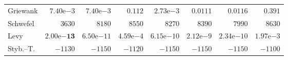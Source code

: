 \begin{tabular}{lrrrrrrr}
Griewank & $7.40\mathrm{e}{-3}$ & $7.40\mathrm{e}{-3}$ & $0.112$ & $2.73\mathrm{e}{-3}$ & $0.0111$ & $0.0116$ & $0.391$ \\
Schwefel & $3630$ & $8180$ & $8550$ & $8270$ & $8390$ & $7990$ & $8630$ \\
Levy & $\mathbf{2.00\mathrm{e}{-13}}$ & $6.50\mathrm{e}{-11}$ & $4.59\mathrm{e}{-4}$ & $6.15\mathrm{e}{-10}$ & $2.12\mathrm{e}{-9}$ & $2.34\mathrm{e}{-10}$ & $1.97\mathrm{e}{-3}$ \\
Styb.--T. & $-1130$ & $-1150$ & $-1120$ & $-1150$ & $-1150$ & $-1150$ & $-1100$ \\
\bottomrule
\end{tabular}
